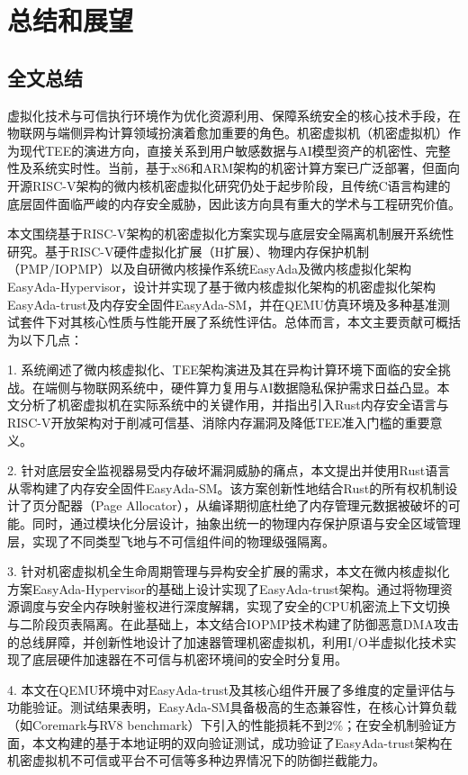 \documentclass[master, vlined, review]{DissertUESTC}
\begin{document}
	\chapter{总结和展望}
	\section{全文总结}
	虚拟化技术与可信执行环境作为优化资源利用、保障系统安全的核心技术手段，在物联网与端侧异构计算领域扮演着愈加重要的角色。机密虚拟机（机密虚拟机）作为现代TEE的演进方向，直接关系到用户敏感数据与AI模型资产的机密性、完整性及系统实时性。当前，基于x86和ARM架构的机密计算方案已广泛部署，但面向开源RISC-V架构的微内核机密虚拟化研究仍处于起步阶段，且传统C语言构建的底层固件面临严峻的内存安全威胁，因此该方向具有重大的学术与工程研究价值。
	
	本文围绕基于RISC-V架构的机密虚拟化方案实现与底层安全隔离机制展开系统性研究。基于RISC-V硬件虚拟化扩展（H扩展）、物理内存保护机制（PMP/IOPMP）以及自研微内核操作系统EasyAda及微内核虚拟化架构EasyAda-Hypervisor，设计并实现了基于微内核虚拟化架构的机密虚拟化架构EasyAda-trust及内存安全固件EasyAda-SM，并在QEMU仿真环境及多种基准测试套件下对其核心性质与性能开展了系统性评估。总体而言，本文主要贡献可概括为以下几点：
	
	1. 系统阐述了微内核虚拟化、TEE架构演进及其在异构计算环境下面临的安全挑战。在端侧与物联网系统中，硬件算力复用与AI数据隐私保护需求日益凸显。本文分析了机密虚拟机在实际系统中的关键作用，并指出引入Rust内存安全语言与RISC-V开放架构对于削减可信基、消除内存漏洞及降低TEE准入门槛的重要意义。
	
	2. 针对底层安全监视器易受内存破坏漏洞威胁的痛点，本文提出并使用Rust语言从零构建了内存安全固件EasyAda-SM。该方案创新性地结合Rust的所有权机制设计了页分配器（Page Allocator），从编译期彻底杜绝了内存管理元数据被破坏的可能。同时，通过模块化分层设计，抽象出统一的物理内存保护原语与安全区域管理层，实现了不同类型飞地与不可信组件间的物理级强隔离。
	
	3. 针对机密虚拟机全生命周期管理与异构安全扩展的需求，本文在微内核虚拟化方案EasyAda-Hypervisor的基础上设计实现了EasyAda-trust架构。通过将物理资源调度与安全内存映射鉴权进行深度解耦，实现了安全的CPU机密流上下文切换与二阶段页表隔离。在此基础上，本文结合IOPMP技术构建了防御恶意DMA攻击的总线屏障，并创新性地设计了加速器管理机密虚拟机，利用I/O半虚拟化技术实现了底层硬件加速器在不可信与机密环境间的安全时分复用。
	
	4. 本文在QEMU环境中对EasyAda-trust及其核心组件开展了多维度的定量评估与功能验证。测试结果表明，EasyAda-SM具备极高的生态兼容性，在核心计算负载（如Coremark与RV8 benchmark）下引入的性能损耗不到2\%；在安全机制验证方面，本文构建的基于本地证明的双向验证测试，成功验证了EasyAda-trust架构在机密虚拟机不可信或平台不可信等多种边界情况下的防御拦截能力。
	
\end{document}
